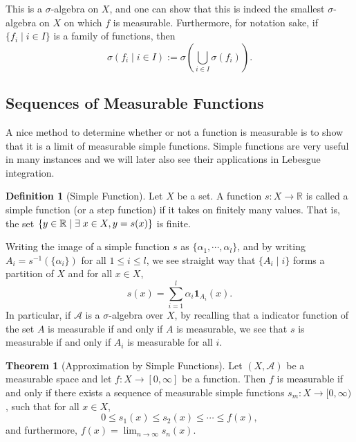 \documentclass[
]{article}
\theoremstyle{definition}
\newtheorem{theorem}{Theorem}
\theoremstyle{definition}
\newtheorem{definition}{Definition}[section]
\begin{document}
This is a \(\sigma\)-algebra on \(X\), and one can show that this is
indeed the smallest \(\sigma\)-algebra on \(X\) on which \(f\) is
measurable. Furthermore, for notation sake, if \(\{f_i \mid i \in I\}\)
is a family of functions, then
\[\sigma(f_i \mid i \in I) := \sigma\left(\bigcup_{i \in I} \sigma(f_i)\right).\]

\hypertarget{sequences-of-measurable-functions}{%
\subsection{Sequences of Measurable
Functions}\label{sequences-of-measurable-functions}}

A nice method to determine whether or not a function is measurable is to
show that it is a limit of measurable simple functions. Simple functions
are very useful in many instances and we will later also see their
applications in Lebesgue integration.

\begin{definition}[Simple Function]
  Let \(X\) be a set. A function \(s : X \to \mathbb{R}\) is called a simple 
  function (or a step function) if it takes on finitely many values. That is, 
  the set \(\{y \in \mathbb{R} \mid \exists\hspace{1mm} x \in X, y = s(x)\}\) is finite.
\end{definition}

Writing the image of a simple function \(s\) as
\(\{\alpha_1, \cdots, \alpha_l\}\), and by writing
\(A_i = s^{-1}(\{\alpha_i\})\) for all \(1 \le i \le l\), we see
straight way that \(\{A_i \mid i\}\) forms a partition of \(X\) and for
all \(x \in X\), \[s(x) = \sum_{i = 1}^l \alpha_i \mathbf{1}_{A_i}(x).\]
In particular, if \(\mathcal{A}\) is a \(\sigma\)-algebra over \(X\), by
recalling that a indicator function of the set \(A\) is measurable if
and only if \(A\) is measurable, we see that \(s\) is measurable if and
only if \(A_i\) is measurable for all \(i\).

\begin{theorem}[Approximation by Simple Functions]
  Let \((X, \mathcal{A})\) be a measurable space and let \(f : X \to [0, \infty]\) 
  be a function. Then \(f\) is measurable if and only if there exists a sequence 
  of measurable simple functions \(s_m : X \to [0, \infty)\), such that 
  for all \(x \in X\),
  \[0 \le s_1(x) \le s_2(x) \le \cdots \le f(x),\]
  and furthermore, \(f(x) = \lim_{n \to \infty}s_n(x)\).
\end{theorem}
\proof
\end{document}
